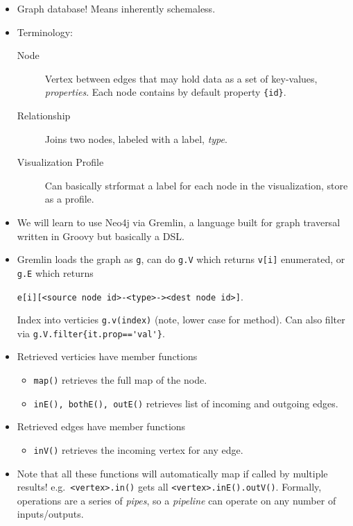 \documentclass[10pt]{article}
\begin{document}
\begin{itemize}
    \item Graph database! Means inherently schemaless.
    \item Terminology:
        \begin{description}
            \item[Node] Vertex between edges that may hold data as a set of
                key-values, \emph{properties}. Each node contains by default
                property \lstinline${id}$.
            \item[Relationship] Joins two nodes, labeled with a label,
                \emph{type}.
            \item[Visualization Profile] Can basically strformat a label for
                each node in the visualization, store as a profile.
        \end{description}
    \item We will learn to use Neo4j via Gremlin, a language built for graph
        traversal written in Groovy but basically a DSL\@.
    \item Gremlin loads the graph as \lstinline{g}, can do \lstinline{g.V} which
        returns \lstinline{v[i]} enumerated, or \lstinline{g.E} which returns

        \lstinline{e[i][<source node id>-<type>-><dest node id>]}.

        Index into verticies \lstinline{g.v(index)} (note, lower case for
        method). Can also filter via \lstinline$g.V.filter{it.prop=='val'}$.

    \item Retrieved verticies have member functions
        \begin{itemize}
            \item \lstinline{map()} retrieves the full map of the node.
            \item \lstinline{inE(), bothE(), outE()} retrieves list of incoming
                and outgoing edges.
        \end{itemize}

    \item Retrieved edges have member functions
        \begin{itemize}
            \item \lstinline{inV()} retrieves the incoming vertex for any edge.
        \end{itemize}
    \item Note that all these functions will automatically map if called by
        multiple results! e.g.\ \lstinline{<vertex>.in()} gets all
        \lstinline{<vertex>.inE().outV()}. Formally, operations are a series of
        \emph{pipes}, so a \emph{pipeline} can operate on any number of
        inputs/outputs.


\end{itemize}
\end{document}
